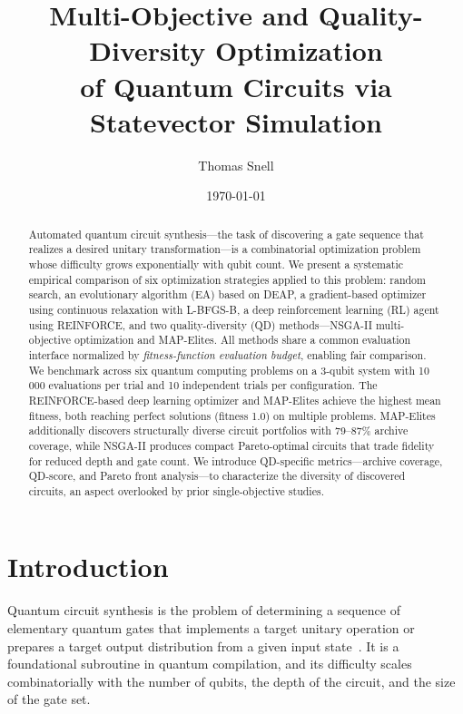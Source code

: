 \documentclass[twocolumn,11pt]{article}
\title{Multi-Objective and Quality-Diversity Optimization\\of Quantum Circuits via Statevector Simulation}
\author{Thomas Snell}
\date{\today}
\begin{document}
\maketitle

\begin{abstract}
Automated quantum circuit synthesis---the task of discovering a gate sequence
that realizes a desired unitary transformation---is a combinatorial optimization
problem whose difficulty grows exponentially with qubit count.  We present a
systematic empirical comparison of six optimization strategies applied to this
problem: random search, an evolutionary algorithm (EA) based on DEAP, a
gradient-based optimizer using continuous relaxation with L-BFGS-B, a deep
reinforcement learning (RL) agent using REINFORCE, and two quality-diversity
(QD) methods---NSGA-II multi-objective optimization and MAP-Elites.  All
methods share a common evaluation interface normalized by \emph{fitness-function
evaluation budget}, enabling fair comparison.  We benchmark across six quantum
computing problems on a 3-qubit system with 10\,000 evaluations per trial and
10 independent trials per configuration.  The REINFORCE-based deep learning
optimizer and MAP-Elites achieve the highest mean fitness, both reaching perfect
solutions (fitness 1.0) on multiple problems.  MAP-Elites additionally discovers
structurally diverse circuit portfolios with 79--87\% archive coverage, while
NSGA-II produces compact Pareto-optimal circuits that trade fidelity for
reduced depth and gate count.  We introduce QD-specific metrics---archive
coverage, QD-score, and Pareto front analysis---to characterize the diversity
of discovered circuits, an aspect overlooked by prior single-objective studies.
\end{abstract}

\section{Introduction}\label{sec:intro}

Quantum circuit synthesis is the problem of determining a sequence of elementary
quantum gates that implements a target unitary operation or prepares a target
output distribution from a given input state~\cite{shende2006synthesis,
dawson2005solovay}.  It is a foundational subroutine in quantum compilation, and
its difficulty scales combinatorially with the number of qubits, the depth of
the circuit, and the size of the gate set.
\end{document}
